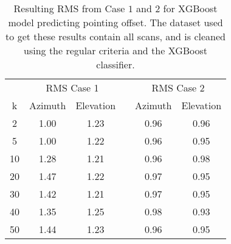 \begin{table}[h]
    \centering %
    \caption{Resulting RMS from Case $1$ and $2$ for XGBoost model predicting pointing offset.
    The dataset used to get these results contain all scans, and is cleaned using the regular criteria and the XGBoost classifier.}
    \begin{tabular}{ccc c cc}
        \toprule
        \multicolumn{1}{c}{} & \multicolumn{2}{c}{RMS Case 1} & & \multicolumn{2}{c}{RMS Case 2} \\
        \cmidrule(lr){2-3} \cmidrule(lr){5-6}
         k & Azimuth & Elevation & & Azimuth & Elevation \\
        \midrule
         2 &  1.00 & 1.23 & & 0.96 &  0.96 \\
         5 &  1.00 & 1.22 & & 0.96 &  0.95 \\
        10 &  1.28 & 1.21 & & 0.96 &  0.98 \\
        20 &  1.47 & 1.22 & & 0.97 &  0.95 \\
        30 &  1.42 & 1.21 & & 0.97 &  0.95 \\
        40 &  1.35 & 1.25 & & 0.98 &  0.93 \\
        50 &  1.44 & 1.23 & & 0.96 &  0.95 \\
        \bottomrule
    \end{tabular}
\end{table}

